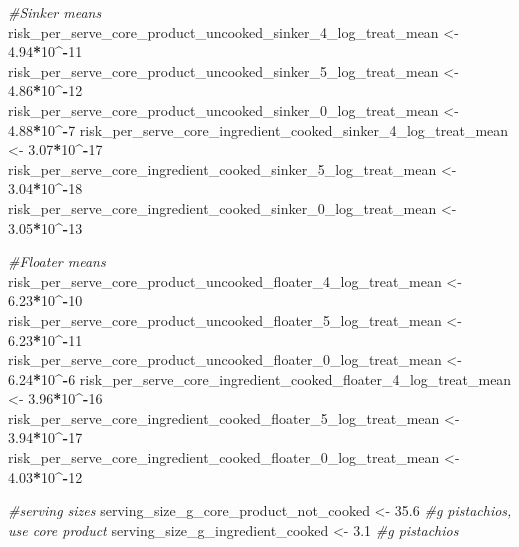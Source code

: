 \documentclass[
]{article}
\newenvironment{Shaded}{\begin{snugshade}}{\end{snugshade}}
\newcommand{\CommentTok}[1]{\textcolor[rgb]{0.56,0.35,0.01}{\textit{#1}}}
\newcommand{\DecValTok}[1]{\textcolor[rgb]{0.00,0.00,0.81}{#1}}
\newcommand{\FloatTok}[1]{\textcolor[rgb]{0.00,0.00,0.81}{#1}}
\newcommand{\NormalTok}[1]{#1}
\newcommand{\OtherTok}[1]{\textcolor[rgb]{0.56,0.35,0.01}{#1}}
\newcommand{\SpecialCharTok}[1]{\textcolor[rgb]{0.81,0.36,0.00}{\textbf{#1}}}
\begin{document}
\begin{Shaded}
\begin{Highlighting}[]
\CommentTok{\#Sinker means}
\NormalTok{risk\_per\_serve\_core\_product\_uncooked\_sinker\_4\_log\_treat\_mean }\OtherTok{\textless{}{-}} \FloatTok{4.94}\SpecialCharTok{*}\DecValTok{10}\SpecialCharTok{\^{}{-}}\DecValTok{11}
\NormalTok{risk\_per\_serve\_core\_product\_uncooked\_sinker\_5\_log\_treat\_mean }\OtherTok{\textless{}{-}} \FloatTok{4.86}\SpecialCharTok{*}\DecValTok{10}\SpecialCharTok{\^{}{-}}\DecValTok{12}
\NormalTok{risk\_per\_serve\_core\_product\_uncooked\_sinker\_0\_log\_treat\_mean }\OtherTok{\textless{}{-}} \FloatTok{4.88}\SpecialCharTok{*}\DecValTok{10}\SpecialCharTok{\^{}{-}}\DecValTok{7}
\NormalTok{risk\_per\_serve\_core\_ingredient\_cooked\_sinker\_4\_log\_treat\_mean }\OtherTok{\textless{}{-}} \FloatTok{3.07}\SpecialCharTok{*}\DecValTok{10}\SpecialCharTok{\^{}{-}}\DecValTok{17}
\NormalTok{risk\_per\_serve\_core\_ingredient\_cooked\_sinker\_5\_log\_treat\_mean }\OtherTok{\textless{}{-}} \FloatTok{3.04}\SpecialCharTok{*}\DecValTok{10}\SpecialCharTok{\^{}{-}}\DecValTok{18}
\NormalTok{risk\_per\_serve\_core\_ingredient\_cooked\_sinker\_0\_log\_treat\_mean }\OtherTok{\textless{}{-}} \FloatTok{3.05}\SpecialCharTok{*}\DecValTok{10}\SpecialCharTok{\^{}{-}}\DecValTok{13}

\CommentTok{\#Floater means  }
\NormalTok{risk\_per\_serve\_core\_product\_uncooked\_floater\_4\_log\_treat\_mean }\OtherTok{\textless{}{-}} \FloatTok{6.23}\SpecialCharTok{*}\DecValTok{10}\SpecialCharTok{\^{}{-}}\DecValTok{10}
\NormalTok{risk\_per\_serve\_core\_product\_uncooked\_floater\_5\_log\_treat\_mean }\OtherTok{\textless{}{-}} \FloatTok{6.23}\SpecialCharTok{*}\DecValTok{10}\SpecialCharTok{\^{}{-}}\DecValTok{11}
\NormalTok{risk\_per\_serve\_core\_product\_uncooked\_floater\_0\_log\_treat\_mean }\OtherTok{\textless{}{-}} \FloatTok{6.24}\SpecialCharTok{*}\DecValTok{10}\SpecialCharTok{\^{}{-}}\DecValTok{6}
\NormalTok{risk\_per\_serve\_core\_ingredient\_cooked\_floater\_4\_log\_treat\_mean }\OtherTok{\textless{}{-}} \FloatTok{3.96}\SpecialCharTok{*}\DecValTok{10}\SpecialCharTok{\^{}{-}}\DecValTok{16}
\NormalTok{risk\_per\_serve\_core\_ingredient\_cooked\_floater\_5\_log\_treat\_mean }\OtherTok{\textless{}{-}} \FloatTok{3.94}\SpecialCharTok{*}\DecValTok{10}\SpecialCharTok{\^{}{-}}\DecValTok{17}
\NormalTok{risk\_per\_serve\_core\_ingredient\_cooked\_floater\_0\_log\_treat\_mean }\OtherTok{\textless{}{-}} \FloatTok{4.03}\SpecialCharTok{*}\DecValTok{10}\SpecialCharTok{\^{}{-}}\DecValTok{12}

\CommentTok{\#serving sizes}
\NormalTok{serving\_size\_g\_core\_product\_not\_cooked }\OtherTok{\textless{}{-}} \FloatTok{35.6} \CommentTok{\#g pistachios, use core product}
\NormalTok{serving\_size\_g\_ingredient\_cooked }\OtherTok{\textless{}{-}} \FloatTok{3.1} \CommentTok{\#g pistachios}


\end{Highlighting}
\end{Shaded}
\end{document}
